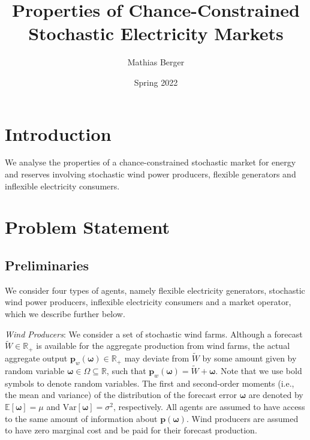 \documentclass{article}
\title{Properties of Chance-Constrained Stochastic Electricity Markets}
\author{Mathias Berger}
\date{Spring 2022}
\begin{document}
\maketitle

\section{Introduction}

We analyse the properties of a chance-constrained stochastic market for energy and reserves involving stochastic wind power producers, flexible generators and inflexible electricity consumers. 

\section{Problem Statement}

\subsection{Preliminaries}

We consider four types of agents, namely flexible electricity generators, stochastic wind power producers, inflexible electricity consumers and a market operator, which we describe further below.

\textit{Wind Producers}: We consider a set of stochastic wind farms. Although a forecast $\tilde{W} \in \mathbb{R}_+$ is available for the aggregate production from wind farms, the actual aggregate output $\mathbf{p}_w(\boldsymbol{\omega}) \in \mathbb{R}_+$ may deviate from $\tilde{W}$ by some amount given by random variable $\boldsymbol{\omega} \in \Omega \subseteq \mathbb{R}$, such that $\mathbf{p}_w(\boldsymbol{\omega}) = \tilde{W} + \boldsymbol{\omega}$. Note that we use bold symbols to denote random variables. The first and second-order moments (i.e., the mean and variance) of the distribution of the forecast error $\boldsymbol{\omega}$ are denoted by $\mathbb{E}[\boldsymbol{\omega}] = \mu$ and $\mbox{Var}[\boldsymbol{\omega}] = \sigma^2$, respectively. All agents are assumed to have access to the same amount of information about $\mathbf{p}(\boldsymbol{\omega})$. Wind producers are assumed to have zero marginal cost and be paid for their forecast production.
\end{document}
